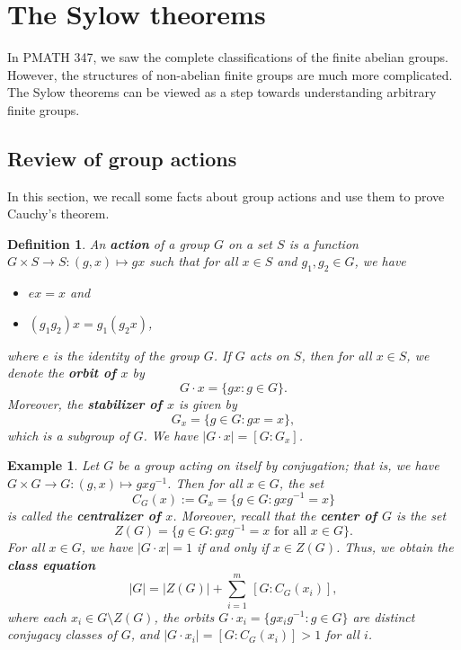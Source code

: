 \documentclass[10pt]{article}
\theoremstyle{newstyle}
\newtheorem{defn}[thm]{Definition}
\newtheorem{exmp}[thm]{Example}
\begin{document}
\newpage 
\section{The Sylow theorems}

In PMATH 347, we saw the complete classifications of the finite abelian groups. However, 
the structures of non-abelian finite groups are much more complicated. The Sylow theorems 
can be viewed as a step towards understanding arbitrary finite groups. 

\subsection{Review of group actions}
In this section, we recall some facts about group actions and use them to prove Cauchy's theorem. 

\begin{defn}
An {\bf action} of a group $G$ on a set $S$ is a function $G \times S \to S : (g, x) \mapsto gx$ 
such that for all $x \in S$ and $g_1, g_2 \in G$, we have 
\begin{itemize}
    \item $ex = x$ and 
    \item $(g_1g_2)x = g_1(g_2x)$,
\end{itemize}
where $e$ is the identity of the group $G$. If $G$ acts on $S$, then for all $x \in S$, 
we denote the {\bf orbit of $x$} by 
\[ G \cdot x = \{gx : g \in G\}. \]
Moreover, the {\bf stabilizer of $x$} is given by 
\[ G_x = \{g \in G : gx = x\}, \]
which is a subgroup of $G$. We have $|G \cdot x| = [G : G_x]$. 
\end{defn}

\begin{exmp}
Let $G$ be a group acting on itself by conjugation; that is, we have 
$G \times G \to G : (g, x) \mapsto gxg^{-1}$. Then for all $x \in G$, the set 
\[ C_G(x) := G_x = \{g \in G : gxg^{-1} = x\} \]
is called the {\bf centralizer of $x$}. Moreover, recall that the {\bf center of $G$} is the set 
\[ Z(G) = \{g \in G : gxg^{-1} = x \text{ for all } x \in G\}. \]
For all $x \in G$, we have $|G \cdot x| = 1$ if and only if $x \in Z(G)$. Thus, we obtain the 
{\bf class equation} 
\[ |G| = |Z(G)| + \sum_{i=1}^m \,[G : C_G(x_i)], \]
where each $x_i \in G \setminus Z(G)$, the orbits $G \cdot x_i = \{gx_i g^{-1} : g \in G\}$ 
are distinct conjugacy classes of $G$, and $|G \cdot x_i| = [G : C_G(x_i)] > 1$ for all $i$. 
\end{exmp}
\end{document}
